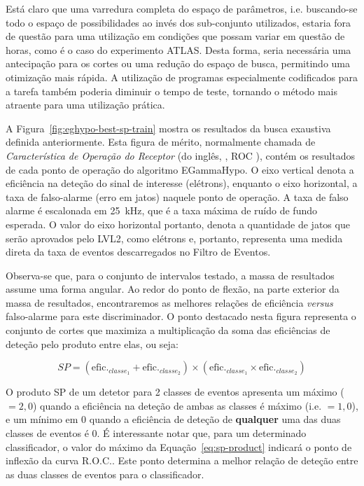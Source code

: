 Está claro que uma varredura completa do espaço de parâmetros,
i.e. buscando-se todo o espaço de possibilidades ao invés dos sub-conjunto
utilizados, estaria fora de questão para uma utilização em condições que
possam variar em questão de horas, como é o caso do experimento ATLAS. Desta
forma, seria necessária uma antecipação para os cortes ou uma redução do
espaço de busca, permitindo uma otimização mais rápida. A utilização de
programas especialmente codificados para a tarefa também poderia diminuir o
tempo de teste, tornando o método mais atraente para uma utilização prática.

A Figura~\ref{fig:eghypo-best-sp-train} mostra os resultados da busca
exaustiva definida anteriormente. Esta figura de mérito, normalmente chamada
de \textit{Característica de Operação do Receptor} (do inglês,
, ROC \cite{vantrees}), contém os
resultados de cada ponto de operação do algoritmo EGammaHypo. O eixo vertical
denota a eficiência na deteção do sinal de interesse (elétrons), enquanto o
eixo horizontal, a taxa de falso-alarme (erro em jatos) naquele ponto de
operação. A taxa de falso alarme é escalonada em 25~kHz, que é a taxa máxima
de ruído de fundo esperada. O valor do eixo horizontal portanto, denota a
quantidade de jatos que serão aprovados pelo LVL2, como elétrons e, portanto,
representa uma medida direta da taxa de eventos descarregados no Filtro de
Eventos.

Observa-se que, para o conjunto de intervalos testado, a massa de resultados
assume uma forma angular. Ao redor do ponto de flexão, na parte exterior da
massa de resultados, encontraremos as melhores relações de eficiência
\textit{versus} falso-alarme para este discriminador. O ponto destacado nesta
figura representa o conjunto de cortes que maximiza a multiplicação da soma
das eficiências de deteção pelo produto entre elas, ou seja:

\begin{equation}
SP = (\text{efic.}_{classe_1} + \text{efic.}_{classe_2}) \times
(\text{efic.}_{classe_1} \times \text{efic.}_{classe_2})
\label{eq:sp-product}
\end{equation}

O produto SP de um detetor para 2 classes de eventos apresenta um máximo
($=2,0$) quando a eficiência na deteção de ambas as classes é máximo
(i.e. $=1,0$), e um mínimo em $0$ quando a eficiência de deteção de
\textbf{qualquer} uma das duas classes de eventos é $0$. É interessante notar
que, para um determinado classificador, o valor do máximo da
Equação~\ref{eq:sp-product} indicará o ponto de inflexão da curva R.O.C.. Este
ponto determina a melhor relação de deteção entre as duas classes de eventos
para o classificador.

